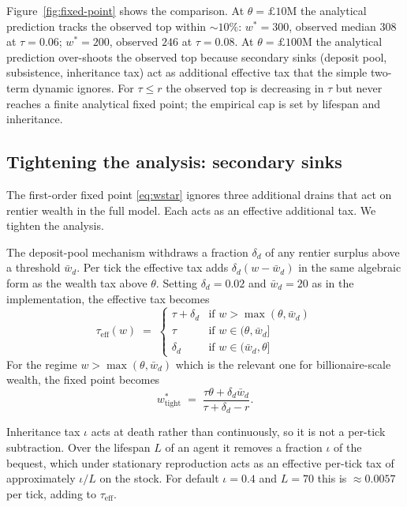 \documentclass[11pt]{article}
\begin{document}
Figure~\ref{fig:fixed-point} shows the comparison.  At $\theta =
\pounds 10$M the analytical prediction tracks the observed top
within $\sim 10\%$: $w^* = 300$, observed median $308$ at $\tau =
0.06$; $w^* = 200$, observed $246$ at $\tau = 0.08$.  At $\theta =
\pounds 100$M the analytical prediction over-shoots the observed top
because secondary sinks (deposit pool, subsistence, inheritance tax)
act as additional effective tax that the simple two-term dynamic
ignores.  For $\tau \leq r$ the observed top is decreasing in $\tau$
but never reaches a finite analytical fixed point; the empirical cap
is set by lifespan and inheritance.

\subsection{Tightening the analysis: secondary sinks}
\label{sec:fixedpoint-tight}

The first-order fixed point \eqref{eq:wstar} ignores three additional
drains that act on rentier wealth in the full model.  Each acts as
an effective additional tax.  We tighten the analysis.

The deposit-pool mechanism withdraws a fraction $\delta_d$ of any
rentier surplus above a threshold $\bar{w}_d$.  Per tick the
effective tax adds $\delta_d (w - \bar{w}_d)$ in the same algebraic
form as the wealth tax above $\theta$.  Setting $\delta_d = 0.02$
and $\bar{w}_d = 20$ as in the implementation, the effective tax
becomes
\begin{equation}
\tau_\text{eff}(w) \;=\;
\begin{cases}
\tau + \delta_d & \text{if } w > \max(\theta, \bar{w}_d) \\
\tau & \text{if } w \in (\theta, \bar{w}_d] \\
\delta_d & \text{if } w \in (\bar{w}_d, \theta]
\end{cases}
\label{eq:tau-eff}
\end{equation}
For the regime $w > \max(\theta, \bar{w}_d)$ which is the relevant
one for billionaire-scale wealth, the fixed point becomes
\begin{equation}
w^*_\text{tight} \;=\;
\frac{\tau \theta + \delta_d \bar{w}_d}{\tau + \delta_d - r}.
\label{eq:wstar-tight}
\end{equation}

Inheritance tax $\iota$ acts at death rather than continuously, so
it is not a per-tick subtraction.  Over the lifespan $L$ of an
agent it removes a fraction $\iota$ of the bequest, which under
stationary reproduction acts as an effective per-tick tax of
approximately $\iota / L$ on the stock.  For default $\iota = 0.4$
and $L = 70$ this is $\approx 0.0057$ per tick, adding to
$\tau_\text{eff}$.
\end{document}
